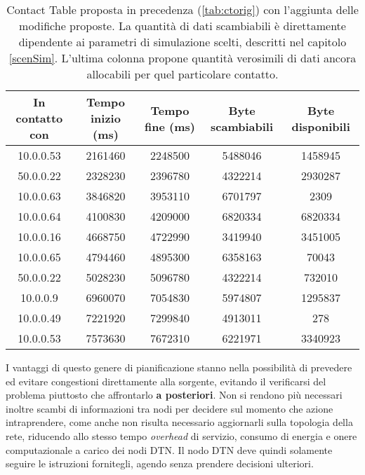 \documentclass[12pt,a4paper,oneside]{book}
\begin{document}
		\begin{table}[h]
			\begin{center}
				\begin{tabular}{| c | c | c | c | c |}
					\hline
					In contatto con & Tempo inizio (ms) & Tempo fine (ms) & Byte scambiabili & Byte disponibili\\
					\hline
					10.0.0.53 & 2161460 & 2248500 & 5488046 & 1458945\\
					50.0.0.22 & 2328230 & 2396780 & 4322214 & 2930287\\
					10.0.0.63 & 3846820 & 3953110 & 6701797 & 2309\\
					10.0.0.64 & 4100830 & 4209000 & 6820334 & 6820334\\
					10.0.0.16 & 4668750 & 4722990 & 3419940 & 3451005\\
					10.0.0.65 & 4794460 & 4895300 & 6358163 & 70043\\
					50.0.0.22 & 5028230 & 5096780 & 4322214 & 732010\\
					10.0.0.9  & 6960070 & 7054830 & 5974807 & 1295837\\
					10.0.0.49 & 7221920 & 7299840 & 4913011 & 278\\
					10.0.0.53 & 7573630 & 7672310 & 6221971 & 3340923\\
					\hline
				\end{tabular}
				\caption{Contact Table proposta in precedenza (\ref{tab:ctorig}) con l'aggiunta delle modifiche proposte. La quantità di dati scambiabili è direttamente dipendente ai parametri di simulazione scelti, descritti nel capitolo \ref{scenSim}. L'ultima colonna propone quantità verosimili di dati ancora allocabili per quel particolare contatto. }
				\label{tab:ctmod}
			\end{center}			
		\end{table}		
		
		I vantaggi di questo genere di pianificazione stanno nella possibilità di prevedere ed evitare congestioni direttamente alla sorgente, evitando il verificarsi del problema piuttosto che affrontarlo {\bf a posteriori}. Non si rendono più necessari inoltre scambi di informazioni tra nodi per decidere sul momento che azione intraprendere, come anche non risulta necessario aggiornarli sulla topologia della rete, riducendo allo stesso tempo {\it overhead} di servizio, consumo di energia e onere computazionale a carico dei nodi DTN. Il nodo DTN deve quindi solamente seguire le istruzioni fornitegli, agendo senza prendere decisioni ulteriori.
		
\end{document}
